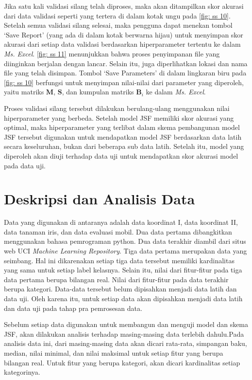 \noindent Jika satu kali validasi silang telah diproses, maka akan ditampilkan skor akurasi dari data validasi seperti yang tertera di dalam kotak ungu pada \ref{fig: ss 10}. Setelah semua validasi silang selesai, maka pengguna dapat menekan tombol `\colorbox{gray!30}{Save Report}' (yang ada di dalam kotak berwarna hijau) untuk menyimpan skor akurasi dari setiap data validasi berdasarkan hiperparameter tertentu ke dalam \emph{Ms. Excel}. \ref{fig: ss 11} menunjukkan bahwa proses penyimpanan file yang diinginkan berjalan dengan lancar. Selain itu, juga diperlihatkan lokasi dan nama file yang telah disimpan. Tombol `\colorbox{gray!30}{Save Parameters}' di dalam lingkaran biru pada \ref{fig: ss 10} berfungsi untuk menyimpan nilai-nilai dari parameter yang diperoleh, yaitu matriks $\mathbf{M}$, $\mathbf{S}$, dan kumpulan matriks $\mathbf{B}_i$ ke dalam \emph{Ms. Excel}.

\noindent Proses validasi silang tersebut dilakukan berulang-ulang menggunakan nilai hiperparameter yang berbeda. Setelah model JSF memiliki skor akurasi yang optimal, maka hiperparameter yang terlibat dalam skema pembangunan model JSF tersebut digunakan untuk mendapatkan model JSF berdasarkan data latih secara keseluruhan, bukan dari beberapa sub data latih. Setelah itu, model yang diperoleh akan diuji terhadap data uji untuk mendapatkan skor akurasi model pada data uji.

\section{Deskripsi dan Analisis Data} \label{tentang data}
\noindent Data yang digunakan di antaranya adalah data koordinat I, data koordinat II, data tanaman iris, dan data evaluasi mobil. Dua data pertama dibangkitkan menggunakan bahasa pemrograman python. Dua data terakhir diambil dari situs web UCI \emph{Machine Learning Repository}. Tiga data pertama merupakan data yang seimbang. Hal ini dikarenakan setiap tiga data tersebut memiliki kardinalitas yang sama untuk setiap label kelasnya. Selain itu, nilai dari fitur-fitur pada tiga data pertama berupa bilangan real. Nilai dari fitur-fitur pada data terakhir berupa kategori. Data-data tersebut belum dipisahkan menjadi data latih dan data uji. Oleh karena itu, untuk setiap data akan dipisahkan menjadi data latih dan data uji pada tahap pra pemrosesan data.

\noindent Sebelum setiap data digunakan untuk membangun dan menguji model dan skema JSF, akan dilakukan analisis terhadap masing-masing data terlebih dahulu.Pada analisis data ini, dari masing-masing data akan dicari rata-rata, simpangan baku, median, nilai minimal, dan nilai maksimal untuk setiap fitur yang berupa bilangan real. Untuk fitur yang berupa kategori, akan dicari kardinalitas setiap kategorinya.

